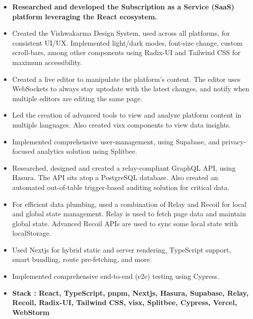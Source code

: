 \documentclass[10pt,a4paper,ragged2e,withhyper]{altacv}
\begin{document}
\tagline{}

\makecvheader



\begin{paracol}{2}


\begin{itemize}
\item \textbf{Researched and developed the Subscription as a Service (SaaS) platform leveraging the React ecosystem.}
\item Created the Vishwakarma Design System, used across all platforms, for consistent UI/UX. Implemented light/dark modes, font-size change, custom scroll-bars, among other components using Radix-UI and Tailwind CSS for maximum accessibility.
\item Created a live editor to manipulate the platform's content. The editor uses WebSockets to always stay uptodate with the latest changes, and notify when multiple editors are editing the same page.
\item Led the creation of advanced tools to view and analyze platform content in multiple languages. Also created visx components to view data insights.
\item Implemented comprehensive user-management, using Supabase, and privacy-focused analytics solution using Splitbee.
\item Researched, designed and created a relay-compliant GraphQL API, using Hasura. The API sits atop a PostgreSQL database. Also created an automated out-of-table trigger-based auditing solution for critical data.
\item For efficient data plumbing, used a combination of Relay and Recoil for local and global state management. Relay is used to fetch page data and maintain global state. Advanced Recoil APIs are used to sync some local state with localStorage.
\item Used Nextjs for hybrid static and server rendering, TypeScript support, smart bundling, route pre-fetching, and more.
\item Implemented comprehensive end-to-end (e2e) testing using Cypress.
\item \textbf{Stack : React, TypeScript, pnpm, Nextjs, Hasura, Supabase, Relay, Recoil, Radix-UI, Tailwind CSS, visx, Splitbee, Cypress, Vercel, WebStorm}
\end{itemize}


\end{paracol}
\end{document}
